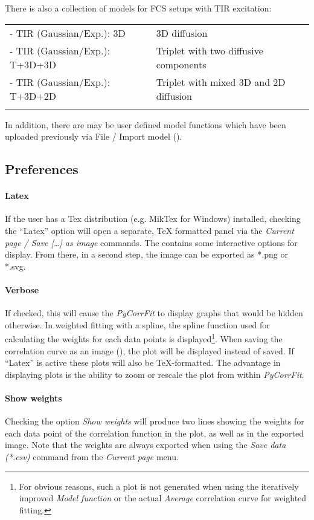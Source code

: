 There is also a collection of models for FCS setups with TIR excitation:

\begin{tabular}{l l}
\rule{0pt}{3ex} - TIR (Gaussian/Exp.): 3D & 3D diffusion \\
\rule{0pt}{3ex} - TIR (Gaussian/Exp.): T+3D+3D & Triplet with two diffusive components \\
\rule{0pt}{3ex} - TIR (Gaussian/Exp.): T+3D+2D & Triplet with mixed 3D and 2D diffusion \\
\rule{0pt}{3ex}
\end{tabular}


In addition, there are may be user defined model functions which have been uploaded previously via File / Import model ().

\subsection{Preferences}
\label{sec:model.prefe}
\paragraph*{Latex} If the user has a Tex distribution (e.g. MikTex for Windows) installed, checking the ``Latex'' option will open a separate, TeX formatted panel via the \textit{Current page / Save […] as image} commands. The contains some interactive options for display. From there, in a second step, the image can be exported as *.png or *.svg.

\paragraph*{Verbose} If checked, this will cause the \textit{PyCorrFit} to display graphs that would be hidden otherwise. In weighted fitting with a spline, the spline function used for calculating the weights for each data points is displayed\footnote{For obvious reasons, such a plot is not generated when using the iteratively improved \textit{Model function} or the actual \textit{Average} correlation curve for weighted fitting.}. When saving the correlation curve as an image (), the plot will be displayed instead of saved. If ``Latex'' is active these plots will also be TeX-formatted. The advantage in displaying plots is the ability to zoom or rescale the plot from within \textit{PyCorrFit}.

\paragraph*{Show weights}
Checking the option \textit{Show weights} will produce two lines showing the weights for each data point of the correlation function in the plot, as well as in the exported image. Note that the weights are always exported when using the \textit{Save data (*.csv)} command from the \textit{Current page} menu.

